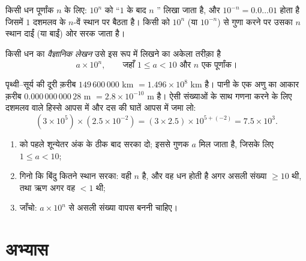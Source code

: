\begin{proposition}[दस की घातें]\label{prop:g9:fractions:ten}
किसी धन पूर्णांक $n$ के लिए: $10^n$ को ``$1$ के बाद $n$ ''
लिखा जाता है, और $10^{-n} = 0.0\dots01$ होता है जिसमें $1$ दशमलव के
$n$-वें स्थान पर बैठता है। किसी  को $10^n$ (या
$10^{-n}$) से गुणा करने पर उसका  $n$ स्थान दाईं (या
बाईं) ओर सरक जाता है।
\end{proposition}

\begin{definition}[वैज्ञानिक लेखन]\label{def:g9:fractions:scientific}
किसी धन  का \emph{वैज्ञानिक
लेखन} उसे इस रूप में लिखने का अकेला तरीक़ा है
\[
a \times 10^n,
\qquad\text{जहाँ } 1 \leq a < 10 \text{ और } n \text{ एक पूर्णांक।}
\]
\end{definition}

\begin{example}\label{ex:g9:fractions:scientific}
पृथ्वी--सूर्य की दूरी क़रीब $149\,600\,000$ km $= 1.496 \times
10^8$ km है। पानी के एक अणु का आकार क़रीब $0.000\,000\,000\,28$ m
$= 2.8 \times 10^{-10}$ m है। ऐसी संख्याओं के साथ गणना करने के लिए
दशमलव वाले हिस्से आपस में और दस की घातें आपस में जमा लो:
\[
(3 \times 10^5) \times (2.5 \times 10^{-2})
= (3 \times 2.5) \times 10^{5 + (-2)}
= 7.5 \times 10^{3}.
\]
\end{example}

\begin{method}[किसी संख्या को वैज्ञानिक लेखन में लिखना]\label{met:g9:fractions:scientific}
\begin{enumerate}
  \item {} को पहले शून्येतर अंक के ठीक बाद सरका दो; इससे
        गुणक $a$ मिल जाता है, जिसके लिए $1 \leq a < 10$;
  \item गिनो कि बिंदु कितने स्थान सरका: वही  $n$ है, और वह धन
        होती है अगर असली संख्या $\geq 10$ थी, तथा ऋण अगर वह $< 1$
        थी;
  \item जाँचो: $a \times 10^n$ से असली संख्या वापस बननी चाहिए।
\end{enumerate}
\end{method}

\section{अभ्यास}

